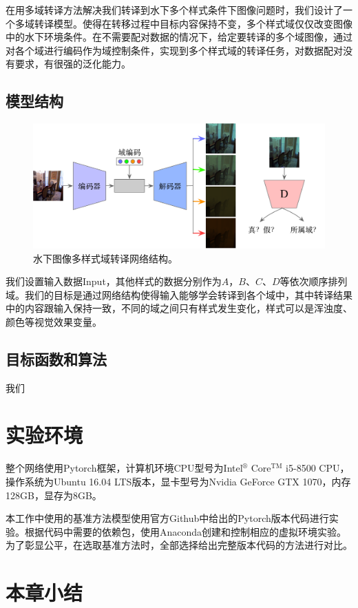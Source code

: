 在用多域转译方法解决我们转译到水下多个样式条件下图像问题时，我们设计了一个多域转译模型。使得在转移过程中目标内容保持不变，多个样式域仅仅改变图像中的水下环境条件。在不需要配对数据的情况下，给定要转译的多个域图像，通过对各个域进行编码作为域控制条件，实现到多个样式域的转译任务，对数据配对没有要求，有很强的泛化能力。

\subsection{模型结构}

\begin{figure}[ht]
    \centering
    \includegraphics[width=1\textwidth]{figures/Domain_network.pdf}
    \caption{水下图像多样式域转译网络结构。}
    \label{fig:domain_net}
\end{figure}

我们设置输入数据Input，其他样式的数据分别作为$A$，$B$、$C$、$D$等依次顺序排列域。我们的目标是通过网络结构使得输入能够学会转译到各个域中，其中转译结果中的内容跟输入保持一致，不同的域之间只有样式发生变化，样式可以是浑浊度、颜色等视觉效果变量。

\subsection{目标函数和算法}
我们





\section{实验环境}
整个网络使用Pytorch框架，计算机环境CPU型号为Intel$^\circledR$ Core$^{\text{TM}}$ i5-8500 CPU，操作系统为Ubuntu 16.04 LTS版本，显卡型号为Nvidia GeForce GTX 1070，内存128GB，显存为8GB。

本工作中使用的基准方法模型使用官方Github中给出的Pytorch版本代码进行实验。根据代码中需要的依赖包，使用Anaconda创建和控制相应的虚拟环境实验。为了彰显公平，在选取基准方法时，全部选择给出完整版本代码的方法进行对比。

\section{本章小结}
